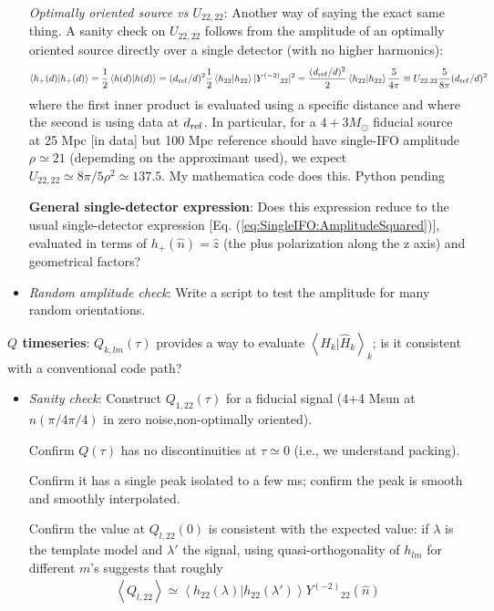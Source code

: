 \documentclass[twocolumn,prd,nofootinbib]{revtex4}
\newcommand\editremark[1]{{\color{red} #1}}
\newcommand\Y[1]{Y^{(#1)}{}}
\newcommand\qmstateproduct[2]{\left\langle#1|#2\right\rangle}
\begin{document}
\begin{widetext}
\begin{itemize}
\begin{shaded}
\noindent \emph{Optimally oriented source vs $U_{22,22}$}: Another way of saying the exact same thing.  A sanity check on $U_{22,22}$ follows from the
amplitude of an optimally oriented source directly over a single detector (with no higher harmonics):
\begin{eqnarray}
\qmstateproduct{h_+(d)}{h_+(d)} = \frac{1}{2} \qmstateproduct{h(d)}{h(d)} 
= (d_{\rm ref}/d)^2\frac{1}{2}\qmstateproduct{h_{22}}{h_{22}} |\Y{-2}_{22}|^2
=\frac{(d_{\rm ref}/d)^2}{2} \qmstateproduct{h_{22}}{h_{22}} \frac{5}{4\pi} \nonumber 
\equiv  U_{22,22} \frac{5}{8\pi} (d_{\rm ref}/d)^2
\end{eqnarray}
where the first inner product is evaluated using a specific distance and where the second is using data at $d_{\rm
  ref}$. 
In particular, for a $4+3 M_\odot$ fiducial source at 25 Mpc [in data] but 100 Mpc reference should have single-IFO amplitude $\rho\simeq 21$
(depemding on the approximant used), we expect $U_{22,22}\simeq 8\pi/5 \rho^2 \simeq 137.5$.  My mathematica code does
this. \editremark{Python pending}


\noindent \textbf{General single-detector expression}: Does this expression reduce to the usual single-detector
expression [Eq. (\ref{eq:SingleIFO:AmplitudeSquared})], evaluated in terms of $h_{+}(\hat{n})=\hat{z}$ (the plus polarization along the z axis) and geometrical
factors?  
\end{shaded}

\item \emph{Random amplitude check}: Write a script to test the amplitude for many random orientations.
\end{itemize}

\noindent \textbf{$Q$ timeseries}: $Q_{k,lm}(\tau)$ provides a way to evaluate $\qmstateproduct{H_k}{\hat{H}_k}_k$; is
it consistent with a conventional code path?  
\begin{itemize}
\item \emph{Sanity check}: Construct $Q_{1,22}(\tau)$ for a fiducial signal (4+4 Msun at $\hat{n}(\pi/4\pi/4)$ in zero
  noise,non-optimally oriented).


Confirm $Q(\tau)$ has no discontinuities at $\tau\simeq 0$ (i.e., we understand packing).

Confirm it has a single peak isolated to a few ms; confirm the peak is smooth and smoothly interpolated.

Confirm the  value at $Q_{l,22}(0)$ is consistent with the expected value: if $\lambda$ is the template model and
$\lambda'$ the signal, using quasi-orthogonality of $h_{lm}$ for different $m$'s suggests that roughly
\begin{eqnarray}
\left< Q_{l,22} \right> \simeq \qmstateproduct{h_{22}(\lambda)}{h_{22}(\lambda')}\Y{-2}_{22}(\hat{n})
\end{eqnarray}


\end{itemize}
\end{widetext}
\end{document}
